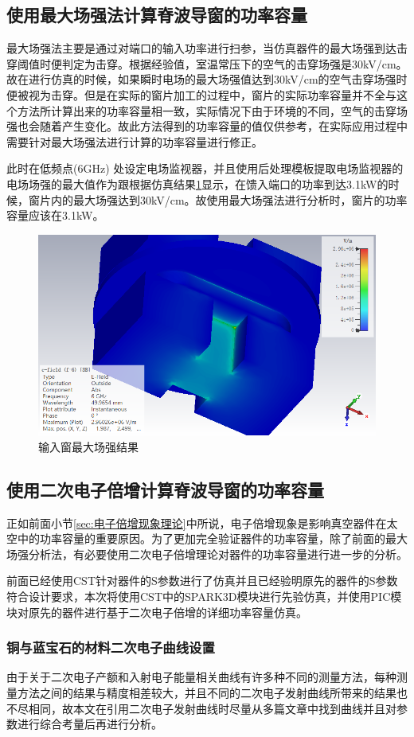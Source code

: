 \documentclass[master]{thesis-uestc}
\begin{document}
\subsection{使用最大场强法计算脊波导窗的功率容量}
最大场强法主要是通过对端口的输入功率进行扫参，当仿真器件的最大场强到达击穿阈值时便判定为击穿。根据经验值，室温常压下的空气的击穿场强是30kV/cm。故在进行仿真的时候，如果瞬时电场的最大场强值达到30kV/cm的空气击穿场强时便被视为击穿。但是在实际的窗片加工的过程中，窗片的实际功率容量并不全与这个方法所计算出来的功率容量相一致，实际情况下由于环境的不同，空气的击穿场强也会随着产生变化。故此方法得到的功率容量的值仅供参考，在实际应用过程中需要针对最大场强法进行计算的功率容量进行修正。

此时在低频点(6GHz) 处设定电场监视器，并且使用后处理模板提取电场监视器的电场场强的最大值作为跟根据仿真结果\ref{fig:输入窗最大场强结果}显示，在馈入端口的功率到达3.1kW的时候，窗片内的最大场强达到30kV/cm。故使用最大场强法进行分析时，窗片的功率容量应该在3.1kW。
\begin{figure}[!htb]
    \centering
    \includegraphics[width=0.5\linewidth]{pic/chapter3/X频段最大功率场强.png}
    \caption{输入窗最大场强结果}
    \label{fig:输入窗最大场强结果}
\end{figure}

\subsection{使用二次电子倍增计算脊波导窗的功率容量}
正如前面小节\ref{sec:电子倍增现象理论}中所说，电子倍增现象是影响真空器件在太空中的功率容量的重要原因。为了更加完全验证器件的功率容量，除了前面的最大场强分析法，有必要使用二次电子倍增理论对器件的功率容量进行进一步的分析。

前面已经使用CST针对器件的S参数进行了仿真并且已经验明原先的器件的S参数符合设计要求，本次将使用CST中的SPARK3D模块进行先验仿真，并使用PIC模块对原先的器件进行基于二次电子倍增的详细功率容量仿真。

\subsubsection{铜与蓝宝石的材料二次电子曲线设置}
由于关于二次电子产额和入射电子能量相关曲线有许多种不同的测量方法，每种测量方法之间的结果与精度相差较大，并且不同的二次电子发射曲线所带来的结果也不尽相同，故本文在引用二次电子发射曲线时尽量从多篇文章中找到曲线并且对参数进行综合考量后再进行分析。
\end{document}
